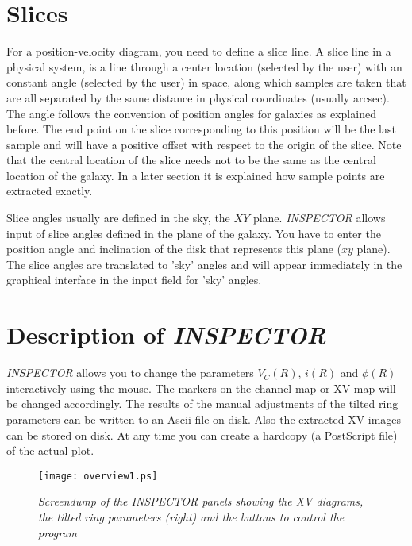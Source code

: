 \documentclass[11pt,a4paper]{article}
\begin{document}
\section{Slices}
For a position-velocity diagram, you need to define a slice line.
A slice line in a physical system, is a line through a center location
(selected by the user) with an constant angle (selected 
by the user) in space, along which samples are taken that are all separated by the
same distance in physical coordinates (usually arcsec). The angle follows the
convention of position angles for galaxies as explained before. 
The end point on the slice corresponding to this position will be the last sample
and will have a positive offset with respect to the origin of the slice.
Note that the central location of the slice needs not to be the same as the central 
location of the galaxy. In a later section it is explained how sample points are
extracted exactly.

Slice angles usually are defined in the sky, the $XY$ plane. {\it INSPECTOR} allows
input of slice angles defined in the plane of the galaxy. You have to enter the 
position angle and inclination of the disk that represents this plane ($xy$ plane).
The slice angles are  translated to 'sky' angles and will appear immediately in the
graphical interface in the input field for 'sky' angles.
\pagebreak

\section{Description of {\it INSPECTOR\ }}
{\it INSPECTOR} allows you to
change the parameters $V_{C}(R)$, $i(R)$ and $\phi(R)$ interactively using the
mouse. The markers on the channel map or XV map will be changed accordingly.
The results of the manual adjustments of the tilted ring parameters 
can be written to an Ascii file
on disk. Also the extracted XV images can be stored on disk. At any time you can 
create a hardcopy (a PostScript file) of the actual plot.

\begin{figure}[h]
  \centering
  \texttt{[image: overview1.ps]}
  \caption{\it Screendump of the INSPECTOR panels showing the XV diagrams,
   the tilted ring parameters (right) and the buttons to control the 
   program }
  \label{fig:overview}
\end{figure}
\end{document}
